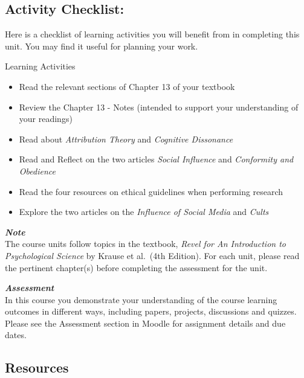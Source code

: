 \documentclass[
]{book}
\providecommand{\tightlist}{%
  \setlength{\itemsep}{0pt}\setlength{\parskip}{0pt}}
\begin{document}
\hypertarget{activity-checklist-5}{%
\subsection*{Activity Checklist:}\label{activity-checklist-5}}

Here is a checklist of learning activities you will benefit from in completing this unit. You may find it useful for planning your work.

\begin{reflect}
{Learning Activities}

\begin{itemize}
\tightlist
\item
  Read the relevant sections of Chapter 13 of your textbook
\item
  Review the Chapter 13 - Notes (intended to support your understanding of your readings)
\item
  Read about \emph{Attribution Theory} and \emph{Cognitive Dissonance}\\
\item
  Read and Reflect on the two articles \emph{Social Influence} and \emph{Conformity and Obedience}
\item
  Read the four resources on ethical guidelines when performing research
\item
  Explore the two articles on the \emph{Influence of Social Media} and \emph{Cults}
\end{itemize}
\end{reflect}

\begin{caution}
\textbf{\emph{Note}}\\
The course units follow topics in the textbook, \emph{Revel for An Introduction to Psychological Science} by Krause et al.~(4th Edition). For each unit, please read the pertinent chapter(s) before completing the assessment for the unit.
\end{caution}

\begin{assessment}
\textbf{\emph{Assessment}}\\
In this course you demonstrate your understanding of the course learning outcomes in different ways, including papers, projects, discussions and quizzes. Please see the Assessment section in Moodle for assignment details and due dates.
\end{assessment}

\hypertarget{resources-5}{%
\subsection*{Resources}\label{resources-5}}
\end{document}
